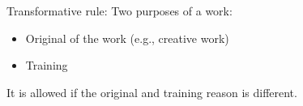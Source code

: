\begin{remark}
    Transformative rule: Two purposes of a work:
    \begin{itemize}
        \item Original of the work (e.g., creative work)
        \item Training
    \end{itemize}
    It is allowed if the original and training reason is different.
\end{remark}